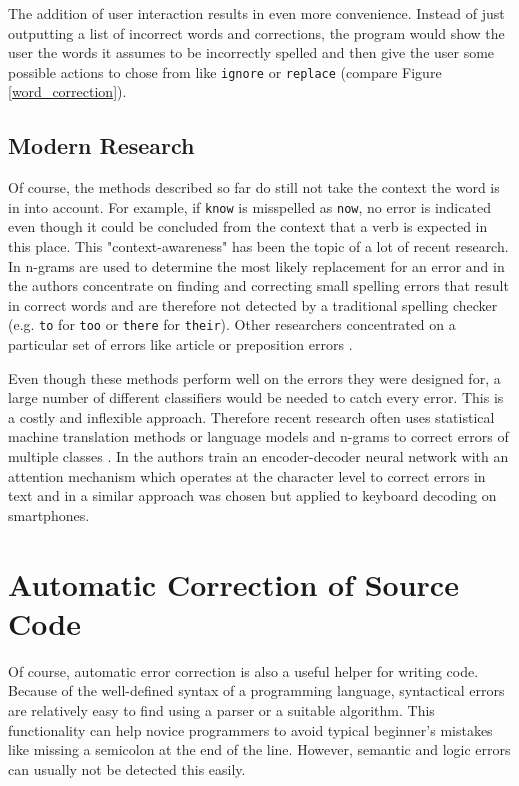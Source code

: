 The addition of user interaction results in even more convenience. Instead of just outputting a list of incorrect words and corrections, the program would show the user the words it assumes to be incorrectly spelled and then give the user some possible actions to chose from like \texttt{ignore} or \texttt{replace} (compare Figure \ref{word_correction}).

\subsection{Modern Research}

Of course, the methods described so far do still not take the context the word is in into account. For example, if \texttt{know} is misspelled as \texttt{now}, no error is indicated even though it could be concluded from the context that a verb is expected in this place. This "context-awareness" has been the topic of a lot of recent research. In \cite{context_n_gram} n-grams are used to determine the most likely replacement for an error and in \cite{context_sensitive_spelling} the authors concentrate on finding and correcting small spelling errors that result in correct words and are therefore not detected by a traditional spelling checker (e.g. \texttt{to} for \texttt{too} or \texttt{there} for \texttt{their}). Other researchers concentrated on a particular set of errors like article \cite{article_correction} or preposition errors \cite{preposition_correction}.

Even though these methods perform well on the errors they were designed for, a large number of different classifiers would be needed to catch every error. This is a costly and inflexible approach. Therefore recent research often uses statistical machine translation methods or language models and n-grams to correct errors of multiple classes \cite{grammatical_error_task}. In \cite{seq2seq_on_text_correction} the authors train an encoder-decoder neural network with an attention mechanism which operates at the character level to correct errors in text and in \cite{seq2seq_keyboard} a similar approach was chosen but applied to keyboard decoding on smartphones.

\section{Automatic Correction of Source Code}
\label{code_correction_section}

Of course, automatic error correction is also a useful helper for writing code. Because of the well-defined syntax of a programming language, syntactical errors are relatively easy to find using a parser or a suitable algorithm. This functionality can help novice programmers to avoid typical beginner's mistakes like missing a semicolon at the end of the line. However, semantic and logic errors can usually not be detected this easily.

